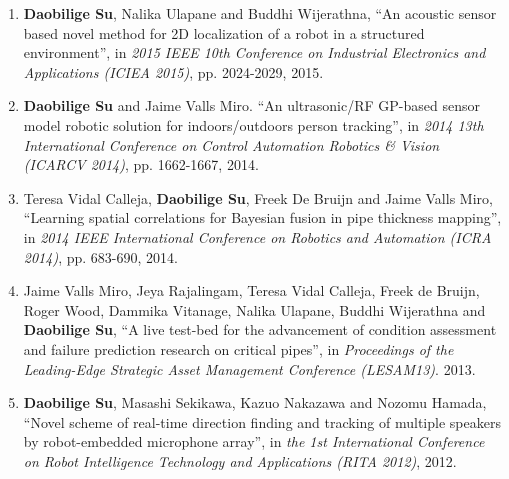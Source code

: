 \documentclass[margin,line]{res}
\newenvironment{list2}{
  \begin{list}{$\bullet$}{%
      \setlength{\itemsep}{0in}
      \setlength{\parsep}{0in} \setlength{\parskip}{0in}
      \setlength{\topsep}{0in} \setlength{\partopsep}{0in} 
      \setlength{\leftmargin}{0.2in}}}{\end{list}}
\begin{document}
\begin{resume}
\begin{enumerate}
\item {\bf Daobilige Su}, Nalika Ulapane and Buddhi Wijerathna, ``An acoustic sensor based novel method for 2D localization of a robot in a structured environment'', in {\it 2015 IEEE 10th Conference on Industrial Electronics and Applications (ICIEA 2015)}, pp. 2024-2029, 2015.

\item {\bf Daobilige Su} and Jaime Valls Miro. ``An ultrasonic/RF GP-based sensor model robotic solution for indoors/outdoors person tracking'', in {\it 2014 13th International Conference on Control Automation Robotics \& Vision (ICARCV 2014)}, pp. 1662-1667, 2014.

\item Teresa Vidal Calleja, {\bf Daobilige Su}, Freek De Bruijn and Jaime Valls Miro, ``Learning spatial correlations for Bayesian fusion in pipe thickness mapping'', in {\it 2014 IEEE International Conference on Robotics and Automation (ICRA 2014)}, pp. 683-690, 2014.

\item Jaime Valls Miro, Jeya Rajalingam, Teresa Vidal Calleja, Freek de Bruijn, Roger Wood, Dammika Vitanage, Nalika Ulapane, Buddhi Wijerathna and {\bf Daobilige Su}, ``A live test-bed for the advancement of condition assessment and failure prediction research on critical pipes'', in {\it Proceedings of the Leading-Edge Strategic Asset Management Conference (LESAM13)}. 2013.

\item {\bf Daobilige Su}, Masashi Sekikawa, Kazuo Nakazawa and Nozomu Hamada, ``Novel scheme of real-time direction finding and tracking of multiple speakers by robot-embedded microphone array'', in {\it the 1st International Conference on Robot Intelligence Technology and Applications (RITA 2012)}, 2012.

\end{enumerate}




%



\end{resume}
\end{document}
